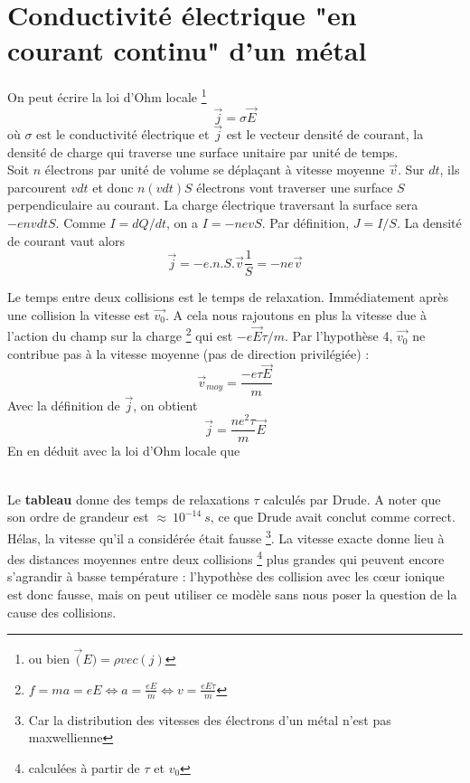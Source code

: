 \section{Conductivité électrique "en courant continu" d'un métal}
On peut écrire la loi d'Ohm locale \footnote{ou bien $\vec(E) = \rho vec(j)$} 
\begin{equation}
\vec{j} = \sigma\vec{E}
\end{equation}
où $\sigma$ est le conductivité électrique et $\vec{j}$ est le vecteur densité de 
courant, la densité de charge qui traverse une surface unitaire par unité de temps.\\

Soit $n$ électrons par unité de volume se déplaçant à vitesse moyenne $\vec{v}$. Sur 
$dt$, ils parcourent $vdt$ et donc $n(vdt)S$ électrons vont traverser une surface $S$ 
perpendiculaire au courant. La charge électrique traversant la surface sera $-envdtS$.
Comme $I = dQ/dt$, on a $I = -nevS$. Par définition, $J = I/S$. La densité de courant 
vaut alors
\begin{equation}
\vec j = -e.n.S.\vec v\frac{1}{S} = -ne\vec{v}
\end{equation}

Le temps entre deux collisions est le temps de relaxation. Immédiatement après une collision 
la vitesse est $\vec{v_0}$. A cela nous rajoutons en plus la vitesse due à l'action du champ
sur la charge \footnote{$f = ma = eE \Leftrightarrow a = \frac{eE}{m} \Leftrightarrow
 v = \frac{eE\tau }{m}$} qui est $-e\vec{E}\tau/m$.
  Par l'hypothèse 4, $\vec{v_0}$ ne contribue pas à la vitesse moyenne (pas de direction privilégiée) :
\begin{equation}
\vec{v}_{moy} = \dfrac{-e\tau\vec E}{m}
\end{equation}
Avec la définition de $\vec j$, on obtient
\begin{equation}
\vec j = \dfrac{ne^2\tau}{m}\vec{E}
\end{equation}
En en déduit avec la loi d'Ohm locale que\\
\


Le \textbf{tableau} donne des temps de relaxations $\tau$ calculés par Drude. A noter 
que son ordre de grandeur est $\approx\ 10^{-14}\ s$, ce que Drude avait conclut comme 
correct.  Hélas, la vitesse qu'il a considérée était fausse \footnote{Car la distribution 
des vitesses des électrons d'un métal n'est pas maxwellienne}. La vitesse exacte donne 
lieu à des distances moyennes entre deux collisions \footnote{calculées à partir de $\tau$
et $v_0$} plus grandes qui peuvent encore s’agrandir à basse température : l’hypothèse
des collision avec les cœur ionique est donc fausse, mais on peut utiliser  ce modèle
sans nous poser la question de la cause des collisions.

